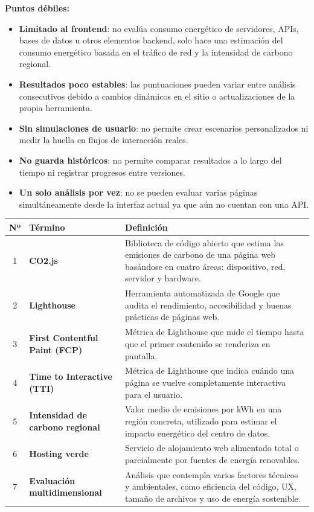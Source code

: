 \documentclass[12pt,a4paper]{report}
\begin{document}
\textbf{Puntos débiles:}
\begin{itemize}
    \item \textbf{Limitado al frontend}: no evalúa consumo energético de servidores, APIs, bases de datos u otros elementos backend, solo hace una estimación del consumo energético basada en el tráfico de red y la intensidad de carbono regional.
    \item \textbf{Resultados poco estables}: las puntuaciones pueden variar entre análisis consecutivos debido a cambios dinámicos en el sitio o actualizaciones de la propia herramienta.
    \item \textbf{Sin simulaciones de usuario}: no permite crear escenarios personalizados ni medir la huella en flujos de interacción reales.
    \item \textbf{No guarda históricos}: no permite comparar resultados a lo largo del tiempo ni registrar progresos entre versiones.
    \item \textbf{Un solo análisis por vez}: no se pueden evaluar varias páginas simultáneamente desde la interfaz actual ya que aún no cuentan con una API.
\end{itemize}

\begin{table}[h]
\centering
\begin{tabular}{@{}cll@{}}
\toprule
\textbf{Nº} & \textbf{Término} & \textbf{Definición} \\
\midrule
1 & \textbf{CO2.js} & Biblioteca de código abierto que estima las emisiones de carbono de una página web basándose en cuatro áreas: dispositivo, red, servidor y hardware. \\
2 & \textbf{Lighthouse} & Herramienta automatizada de Google que audita el rendimiento, accesibilidad y buenas prácticas de páginas web. \\
3 & \textbf{First Contentful Paint (FCP)} & Métrica de Lighthouse que mide el tiempo hasta que el primer contenido se renderiza en pantalla. \\
4 & \textbf{Time to Interactive (TTI)} & Métrica de Lighthouse que indica cuándo una página se vuelve completamente interactiva para el usuario. \\
5 & \textbf{Intensidad de carbono regional} & Valor medio de emisiones por kWh en una región concreta, utilizado para estimar el impacto energético del centro de datos. \\
6 & \textbf{Hosting verde} & Servicio de alojamiento web alimentado total o parcialmente por fuentes de energía renovables. \\
7 & \textbf{Evaluación multidimensional} & Análisis que contempla varios factores técnicos y ambientales, como eficiencia del código, UX, tamaño de archivos y uso de energía sostenible. \\
\bottomrule
\end{tabular}
\end{table}
\end{document}
